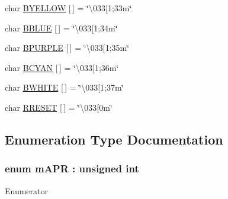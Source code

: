 \begin{DoxyCompactItemize}
\item 
char \hyperlink{namespace_k_aa522b04bcf50df65fd4819d0b46d6664}{B\+Y\+E\+L\+L\+OW} \mbox{[}$\,$\mbox{]} = \char`\"{}\textbackslash{}033\mbox{[}1;33m\char`\"{}
\item 
char \hyperlink{namespace_k_a2fcd49453f10ffd3ccb5aebe30f5d0c0}{B\+B\+L\+UE} \mbox{[}$\,$\mbox{]} = \char`\"{}\textbackslash{}033\mbox{[}1;34m\char`\"{}
\item 
char \hyperlink{namespace_k_adcaba86455bd5bd0cbdeac28c4fced2b}{B\+P\+U\+R\+P\+LE} \mbox{[}$\,$\mbox{]} = \char`\"{}\textbackslash{}033\mbox{[}1;35m\char`\"{}
\item 
char \hyperlink{namespace_k_a2c3e50cb34db635087047ef75ab1ca52}{B\+C\+Y\+AN} \mbox{[}$\,$\mbox{]} = \char`\"{}\textbackslash{}033\mbox{[}1;36m\char`\"{}
\item 
char \hyperlink{namespace_k_a723a80b3fad44765a8c6371fd4841609}{B\+W\+H\+I\+TE} \mbox{[}$\,$\mbox{]} = \char`\"{}\textbackslash{}033\mbox{[}1;37m\char`\"{}
\item 
char \hyperlink{namespace_k_a610d2184e75b6475eaf1f16700be824e}{R\+R\+E\+S\+ET} \mbox{[}$\,$\mbox{]} = \char`\"{}\textbackslash{}033\mbox{[}0m\char`\"{}
\end{DoxyCompactItemize}


\subsection{Enumeration Type Documentation}
\subsubsection[{\texorpdfstring{m\+A\+PR}{mAPR}}]{\setlength{\rightskip}{0pt plus 5cm}enum {\bf m\+A\+PR} \+: unsigned int\hspace{0.3cm}{\ttfamily [strong]}}\hypertarget{namespace_k_a8fb2f5e34d77eef380ac27a7737a3a25}{}\label{namespace_k_a8fb2f5e34d77eef380ac27a7737a3a25}
\begin{Desc}
\item[Enumerator]\par
\begin{description}
\item[{\em 
Off\hypertarget{namespace_k_a8fb2f5e34d77eef380ac27a7737a3a25ad15305d7a4e34e02489c74a5ef542f36}{}\label{namespace_k_a8fb2f5e34d77eef380ac27a7737a3a25ad15305d7a4e34e02489c74a5ef542f36}
}]\item[{\em 
Size\hypertarget{namespace_k_a8fb2f5e34d77eef380ac27a7737a3a25a6f6cb72d544962fa333e2e34ce64f719}{}\label{namespace_k_a8fb2f5e34d77eef380ac27a7737a3a25a6f6cb72d544962fa333e2e34ce64f719}
}]\item[{\em 
Size\+Width\hypertarget{namespace_k_a8fb2f5e34d77eef380ac27a7737a3a25a521e68d07542f40555e0bd6361547f8a}{}\label{namespace_k_a8fb2f5e34d77eef380ac27a7737a3a25a521e68d07542f40555e0bd6361547f8a}
}]\end{description}
\end{Desc}


